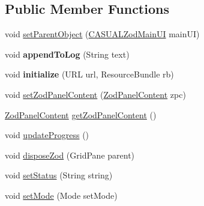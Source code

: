 \subsection*{Public Member Functions}
\begin{DoxyCompactItemize}
\item 
void \hyperlink{classcom_1_1casual__dev_1_1zodui_1_1contentpanel_1_1_zod_panel_controller_a94f8644e144af589b7f32db4ead68127}{set\-Parent\-Object} (\hyperlink{classcom_1_1casual__dev_1_1zodui_1_1_c_a_s_u_a_l_zod_main_u_i}{C\-A\-S\-U\-A\-L\-Zod\-Main\-U\-I} main\-U\-I)
\item 
\hypertarget{classcom_1_1casual__dev_1_1zodui_1_1contentpanel_1_1_zod_panel_controller_aba5e0457a9562fe6afd3eebf920e2a36}{void {\bfseries append\-To\-Log} (String text)}\label{classcom_1_1casual__dev_1_1zodui_1_1contentpanel_1_1_zod_panel_controller_aba5e0457a9562fe6afd3eebf920e2a36}

\item 
\hypertarget{classcom_1_1casual__dev_1_1zodui_1_1contentpanel_1_1_zod_panel_controller_a9006ba858948ea59ebde5fc972e5543a}{void {\bfseries initialize} (U\-R\-L url, Resource\-Bundle rb)}\label{classcom_1_1casual__dev_1_1zodui_1_1contentpanel_1_1_zod_panel_controller_a9006ba858948ea59ebde5fc972e5543a}

\item 
void \hyperlink{classcom_1_1casual__dev_1_1zodui_1_1contentpanel_1_1_zod_panel_controller_a1b3e757fc864daae3f70fe238b14e2e7}{set\-Zod\-Panel\-Content} (\hyperlink{classcom_1_1casual__dev_1_1zodui_1_1contentpanel_1_1_zod_panel_content}{Zod\-Panel\-Content} zpc)
\item 
\hyperlink{classcom_1_1casual__dev_1_1zodui_1_1contentpanel_1_1_zod_panel_content}{Zod\-Panel\-Content} \hyperlink{classcom_1_1casual__dev_1_1zodui_1_1contentpanel_1_1_zod_panel_controller_aeebf377e299eb2a0d36aeece0de7c37b}{get\-Zod\-Panel\-Content} ()
\item 
void \hyperlink{classcom_1_1casual__dev_1_1zodui_1_1contentpanel_1_1_zod_panel_controller_acc837990941b334a053aa705d4011831}{update\-Progress} ()
\item 
void \hyperlink{classcom_1_1casual__dev_1_1zodui_1_1contentpanel_1_1_zod_panel_controller_ae27f3d5783172b52cd08d6cbab5c4fb3}{dispose\-Zod} (Grid\-Pane parent)
\item 
void \hyperlink{classcom_1_1casual__dev_1_1zodui_1_1contentpanel_1_1_zod_panel_controller_a99878bae4e31a622da87e7338dfb2e30}{set\-Status} (String string)
\item 
void \hyperlink{classcom_1_1casual__dev_1_1zodui_1_1contentpanel_1_1_zod_panel_controller_af40b7f426683cfb677f4517ac9ca830d}{set\-Mode} (Mode set\-Mode)
\end{DoxyCompactItemize}
